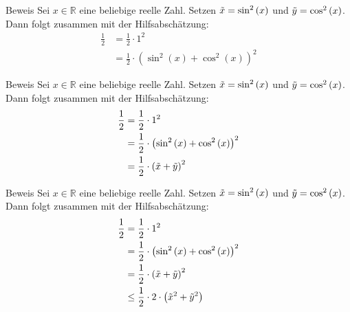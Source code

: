\documentclass[10pt]{beamer}
\def\bR{\mathbb{R}}
\begin{document}
\begin{frame}{Beweis}
    Sei \( x \in \bR \) eine beliebige reelle Zahl. Setzen \( \Tilde{x} = \sin^{2}\left( x \right) \) und \( \Tilde{y} = \cos^{2}\left( x \right) \). Dann folgt zusammen mit der Hilfsabschätzung:
    \begin{align*}
        \frac{1}{2}
        & = \frac{1}{2} \cdot 1^{2} \\
        & = \frac{1}{2} \cdot \left( \sin^{2}\left( x \right) + \cos^{2}\left( x \right) \right)^{2}
    \end{align*}
\end{frame}



\begin{frame}{Beweis}
    Sei \( x \in \bR \) eine beliebige reelle Zahl. Setzen \( \Tilde{x} = \sin^{2}\left( x \right) \) und \( \Tilde{y} = \cos^{2}\left( x \right) \). Dann folgt zusammen mit der Hilfsabschätzung:
    \begin{align*}
        \frac{1}{2}
        & = \frac{1}{2} \cdot 1^{2} \\
        & = \frac{1}{2} \cdot \left( \sin^{2}\left( x \right) + \cos^{2}\left( x \right) \right)^{2} \\
        & = \frac{1}{2} \cdot \left( \Tilde{x} + \Tilde{y} \right)^{2}
    \end{align*}
\end{frame}



\begin{frame}{Beweis}
    Sei \( x \in \bR \) eine beliebige reelle Zahl. Setzen \( \Tilde{x} = \sin^{2}\left( x \right) \) und \( \Tilde{y} = \cos^{2}\left( x \right) \). Dann folgt zusammen mit der Hilfsabschätzung:
    \begin{align*}
        \frac{1}{2}
        & = \frac{1}{2} \cdot 1^{2} \\
        & = \frac{1}{2} \cdot \left( \sin^{2}\left( x \right) + \cos^{2}\left( x \right) \right)^{2} \\
        & = \frac{1}{2} \cdot \left( \Tilde{x} + \Tilde{y} \right)^{2} \\
        & \leq \frac{1}{2} \cdot 2 \cdot \left( \Tilde{x}^{2} + \Tilde{y}^{2} \right)
    \end{align*}
\end{frame}
\end{document}
